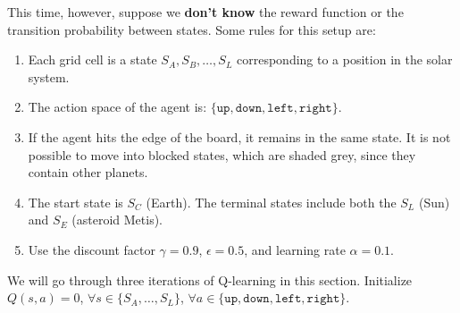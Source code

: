 \documentclass[11pt,addpoints,answers]{exam}
\newcommand{\sall}{\textbf{Select all that apply: }}
\begin{document}
\begin{questions}
\begin{center}
\begin{tikzpicture}
\end{tikzpicture}
\end{center}

This time, however, suppose we \textbf{don't know} the reward function or the transition probability between states. Some rules for this setup are:

\begin{enumerate}
    \item Each grid cell is a state $S_A, S_B, \hdots , S_L$ corresponding to a position in the solar system.
    \item The action space of the agent is: $\{\texttt{up}, \texttt{down}, \texttt{left}, \texttt{right}\}$.
    \item If the agent hits the edge of the board, it remains in the same state. It is not possible to move into blocked states, which are shaded grey, since they contain other planets.
    \item The start state is $S_C$ (Earth). The terminal states include both the $S_L$ (Sun) and $S_E$ (asteroid Metis).
    \item Use the discount factor $\gamma = 0.9$, $\epsilon=0.5$, and learning rate $\alpha=0.1$.
\end{enumerate}

We will go through three iterations of Q-learning in this section. Initialize $Q(s,a)=0$, $\forall s \in \{S_A, \hdots, S_L\}$, $\forall a \in \{\texttt{up}, \texttt{down}, \texttt{left}, \texttt{right}\}$. 

\end{questions}
\end{document}
